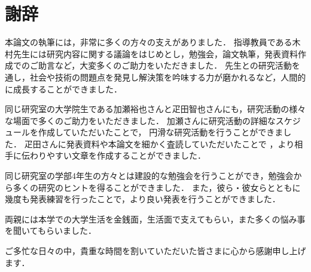 \documentclass[12pt,a4j]{jreport}
\begin{document}
\chapter*{謝辞}

本論文の執筆には，非常に多くの方々の支えがありました．
指導教員である木村先生には研究内容に関する議論をはじめとし，勉強会，論文執筆，発表資料作成でのご助言など，大変多くのご助力をいただきました．
先生との研究活動を通し，社会や技術の問題点を発見し解決策を吟味する力が磨かれるなど，人間的に成長することができました．

同じ研究室の大学院生である加瀬裕也さんと疋田智也さんにも，研究活動の様々な場面で多くのご助力をいただきました．
加瀬さんに研究活動の詳細なスケジュールを作成していただいたことで，
円滑な研究活動を行うことができました．
疋田さんに発表資料や本論文を細かく査読していただいたことで
，より相手に伝わりやすい文章を作成することができました．

同じ研究室の学部4年生の方々とは建設的な勉強会を行うことができ，勉強会から多くの研究のヒントを得ることができました．
また，彼ら・彼女らとともに幾度も発表練習を行ったことで，より良い発表を行うことができました．

両親には本学での大学生活を金銭面，生活面で支えてもらい，また多くの悩み事を聞いてもらいました．

ご多忙な日々の中，貴重な時間を割いていただいた皆さまに心から感謝申し上げます．




\end{document}
